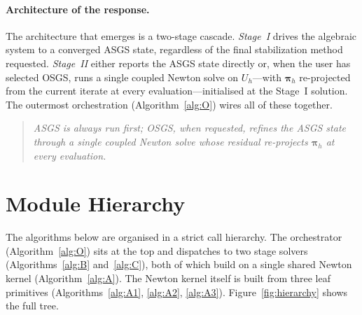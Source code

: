 \documentclass{article}
\begin{document}
\paragraph{Architecture of the response.}  The architecture that emerges
is a two-stage cascade. \emph{Stage~I} drives the algebraic system to a
converged ASGS state, regardless of the final stabilization method
requested. \emph{Stage~II} either reports the ASGS state directly or,
when the user has selected OSGS, runs a single coupled Newton solve on
$U_h$---with $\boldsymbol{\pi}_h$ re-projected from the current iterate
at every evaluation---initialised at the Stage~I solution. The
outermost orchestration (Algorithm~\ref{alg:O}) wires all of these
together.

\begin{quote}
\itshape
ASGS is always run first; OSGS, when requested, refines the ASGS state
through a single coupled Newton solve whose residual re-projects
$\boldsymbol{\pi}_h$ at every evaluation.
\end{quote}

\section{Module Hierarchy}
\label{sec:tree}

The algorithms below are organised in a strict call hierarchy. The
orchestrator (Algorithm~\ref{alg:O}) sits at the top and dispatches to
two stage solvers (Algorithms~\ref{alg:B} and~\ref{alg:C}), both of
which build on a single shared Newton kernel
(Algorithm~\ref{alg:A}). The Newton kernel itself is built from three
leaf primitives (Algorithms~\ref{alg:A1}, \ref{alg:A2}, \ref{alg:A3}).
Figure~\ref{fig:hierarchy} shows the full tree.
\end{document}
